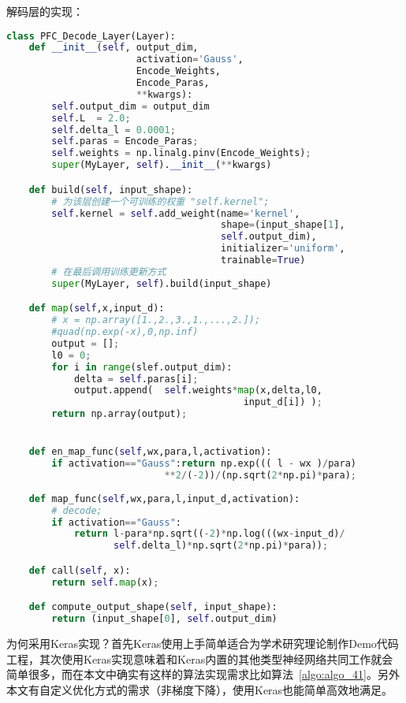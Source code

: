 解码层的实现：

\begin{lstlisting}[language=Python, caption=解码层的实现代码, label={code:first-code}]
class PFC_Decode_Layer(Layer):
    def __init__(self, output_dim, 
                       activation='Gauss',
                       Encode_Weights, 
                       Encode_Paras,
                       **kwargs):
        self.output_dim = output_dim
        self.L  = 2.0;
        self.delta_l = 0.0001;
        self.paras = Encode_Paras;
        self.weights = np.linalg.pinv(Encode_Weights);
        super(MyLayer, self).__init__(**kwargs)

    def build(self, input_shape):
        # 为该层创建一个可训练的权重 "self.kernel";
        self.kernel = self.add_weight(name='kernel', 
                                      shape=(input_shape[1], 
                                      self.output_dim),
                                      initializer='uniform',
                                      trainable=True)
        # 在最后调用训练更新方式
        super(MyLayer, self).build(input_shape) 

    def map(self,x,input_d):
        # x = np.array([1.,2.,3.,1.,...,2.]);
        #quad(np.exp(-x),0,np.inf)
        output = [];
        l0 = 0;
        for i in range(slef.output_dim):
            delta = self.paras[i];
            output.append(  self.weights*map(x,delta,l0,
                                          input_d[i]) );
        return np.array(output);


    def en_map_func(self,wx,para,l,activation):
        if activation=="Gauss":return np.exp((( l - wx )/para)
                            **2/(-2))/(np.sqrt(2*np.pi)*para);
    
    def map_func(self,wx,para,l,input_d,activation):
        # decode;
        if activation=="Gauss":
            return l-para*np.sqrt((-2)*np.log(((wx-input_d)/
                   self.delta_l)*np.sqrt(2*np.pi)*para));

    def call(self, x):
        return self.map(x);

    def compute_output_shape(self, input_shape):
        return (input_shape[0], self.output_dim)     
\end{lstlisting}

为何采用Keras实现？首先Keras使用上手简单适合为学术研究理论制作Demo代码工程，其次使用Keras实现意味着和Keras内置的其他类型神经网络共同工作就会简单很多，而在本文中确实有这样的算法实现需求比如算法~\ref{algo:algo_41}。另外本文有自定义优化方式的需求（非梯度下降），使用Keras也能简单高效地满足。

